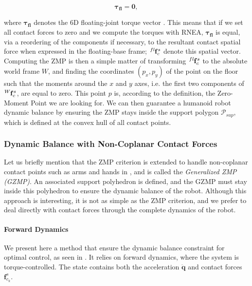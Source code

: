 \begin{equation}
\label{eq:chap3-dynamic-balance-inverse}
 \boldsymbol{\tau_{fl}}=\mathbf{0},
\end{equation}

where $\boldsymbol{\tau_{fl}}$ denotes the 6D floating-joint torque
vector \cite{hirukawa2006universal}. This means that if we set all
contact forces to zero and we compute the torques with RNEA,
$\boldsymbol{\tau_{fl}}$ is equal, via a reordering of the components
if necessary, to the resultant contact spatial force when expressed in
the floating-base frame; $\tensor*[^{fl}]{\mathbf{f}}{_c^s}$ denote
this spatial vector. Computing the ZMP is then a simple matter of
transforming $\tensor*[^{fl}]{\mathbf{f}}{_c^s}$ to the absolute world
frame $W$, and finding the coordinates $(p_x,p_y)$ of the point on the
floor such that the moments around the $x$ and $y$ axes, i.e. the
first two components of $\tensor*[^W]{\mathbf{f}}{_c^s}$, are equal to
zero. This point $p$ is, according to the definition, the Zero-Moment
Point we are looking for. We can then guarantee a humanoid robot
dynamic balance by ensuring the ZMP stays inside the support polygon
$\mathcal{P}_{sup}$, which is defined at the convex hull of all
contact points.

\subsubsection{Dynamic Balance with Non-Coplanar Contact Forces}

Let us briefly mention that the ZMP criterion is extended to handle
non-coplanar contact points such as arms and hands in
\cite{harada2003zmp}, and is called the \emph{Generalized ZMP
  (GZMP)}. An associated support polyhedron is defined, and the GZMP
must stay inside this polyhedron to ensure the dynamic balance of the
robot. Although this approach is interesting, it is not as simple as
the ZMP criterion, and we prefer to deal directly with contact forces
through the complete dynamics of the robot.

\paragraph{Forward Dynamics}

We present here a method that ensure the dynamic balance constraint
for optimal control, as seen in \cite{mombaur2005open}. It relies on
forward dynamics, where the system is torque-controlled. The state
contains both the acceleration $\ddot{\mathbf{q}}$ and contact forces
$\mathbf{f}^s_{c_k}$. 

